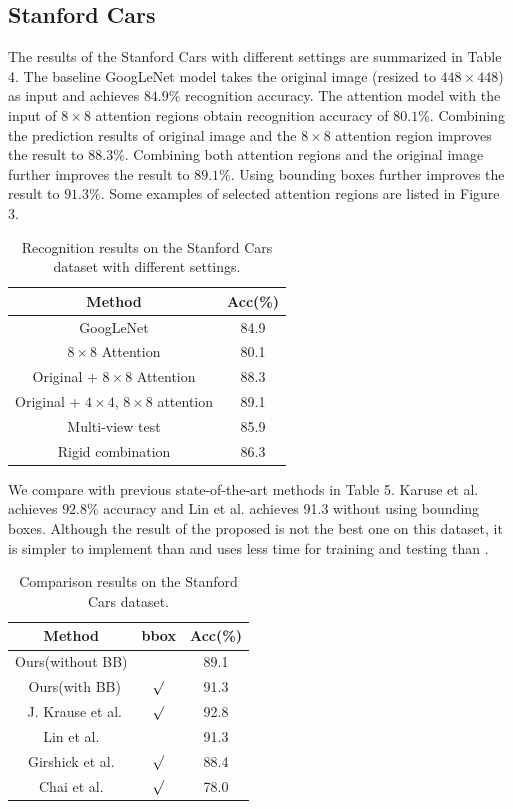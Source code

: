 \documentclass[10pt,twocolumn,letterpaper]{article}
\begin{document}
\subsection{Stanford Cars}
The results of the Stanford Cars with different settings are summarized in Table 4.
The baseline GoogLeNet model takes the original image (resized to $448\times448$) as input and achieves $84.9\%$ recognition accuracy.
The attention model with the input of $8\times8$ attention regions obtain recognition accuracy of $80.1\%$.
Combining the prediction results of original image and the $8\times8$ attention region improves the result to $88.3\%$.
Combining both attention regions and the original image further improves the result to $89.1\%$.
Using bounding boxes further improves the result to $91.3\%$.
Some examples of selected attention regions are listed in Figure 3.

\begin{table}[htb]
\begin{center}
\begin{tabular}
{c|c}\hline
Method &   Acc(\%) \\\hline\hline
GoogLeNet  & 84.9 \\
$8\times8$ Attention  & 80.1 \\
Original + $8\times8$ Attention & 88.3 \\
Original + $4\times4$, $8\times8$ attention & 89.1 \\
Multi-view test  & 85.9 \\
Rigid combination & 86.3 \\\hline
\end{tabular}
\caption{Recognition results on the Stanford Cars dataset with different settings.}
\end{center}
\end{table}

We compare with previous state-of-the-art methods in Table 5.
Karuse et al. \cite{bd21} achieves $92.8\%$ accuracy and Lin et al. \cite{bd16} achieves 91.3 without using bounding boxes.
Although the result of the proposed is not the best one on this dataset, it is simpler to implement than \cite{bd21} and uses less time for training and testing than \cite{bd16}.

\begin{table}[htb]
\begin{center}
\begin{tabular}
{c||c|c}\hline
Method &  bbox & Acc(\%) \\\hline\hline
Ours(without BB) &  & 89.1 \\\
Ours(with BB) & $\surd$ & 91.3 \\\
J. Krause et al. \cite{bd22} &  $\surd$ & 92.8 \\
Lin et al. \cite{bd16} &  & 91.3 \\
Girshick et al. \cite{bd24} & $\surd$ & 88.4 \\
Chai et al. \cite{bd25} & $\surd$  & 78.0 \\\hline
\end{tabular}
\caption{Comparison results on the Stanford Cars dataset.}
\end{center}
\end{table}
\end{document}
